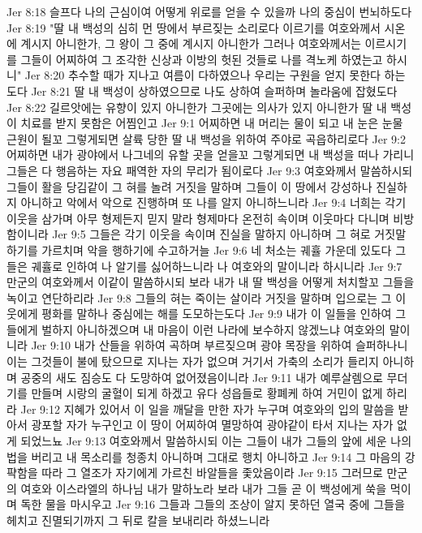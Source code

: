 Jer 8:18  슬프다 나의 근심이여 어떻게 위로를 얻을 수 있을까 나의 중심이 번뇌하도다
Jer 8:19  "딸 내 백성의 심히 먼 땅에서 부르짖는 소리로다 이르기를 여호와께서 시온에 계시지 아니한가, 그 왕이 그 중에 계시지 아니한가 그러나 여호와께서는 이르시기를 그들이 어찌하여 그 조각한 신상과 이방의 헛된 것들로 나를 격노케 하였는고 하시니"
Jer 8:20  추수할 때가 지나고 여름이 다하였으나 우리는 구원을 얻지 못한다 하는도다
Jer 8:21  딸 내 백성이 상하였으므로 나도 상하여 슬퍼하며 놀라움에 잡혔도다
Jer 8:22  길르앗에는 유향이 있지 아니한가 그곳에는 의사가 있지 아니한가 딸 내 백성이 치료를 받지 못함은 어찜인고
Jer 9:1  어찌하면 내 머리는 물이 되고 내 눈은 눈물 근원이 될꼬 그렇게되면 살륙 당한 딸 내 백성을 위하여 주야로 곡읍하리로다
Jer 9:2  어찌하면 내가 광야에서 나그네의 유할 곳을 얻을꼬 그렇게되면 내 백성을 떠나 가리니 그들은 다 행음하는 자요 패역한 자의 무리가 됨이로다
Jer 9:3  여호와께서 말씀하시되 그들이 활을 당김같이 그 혀를 놀려 거짓을 말하며 그들이 이 땅에서 강성하나 진실하지 아니하고 악에서 악으로 진행하며 또 나를 알지 아니하느니라
Jer 9:4  너희는 각기 이웃을 삼가며 아무 형제든지 믿지 말라 형제마다 온전히 속이며 이웃마다 다니며 비방함이니라
Jer 9:5  그들은 각기 이웃을 속이며 진실을 말하지 아니하며 그 혀로 거짓말 하기를 가르치며 악을 행하기에 수고하거늘
Jer 9:6  네 처소는 궤휼 가운데 있도다 그들은 궤휼로 인하여 나 알기를 싫어하느니라 나 여호와의 말이니라 하시니라
Jer 9:7  만군의 여호와께서 이같이 말씀하시되 보라 내가 내 딸 백성을 어떻게 처치할꼬 그들을 녹이고 연단하리라
Jer 9:8  그들의 혀는 죽이는 살이라 거짓을 말하며 입으로는 그 이웃에게 평화를 말하나 중심에는 해를 도모하는도다
Jer 9:9  내가 이 일들을 인하여 그들에게 벌하지 아니하겠으며 내 마음이 이런 나라에 보수하지 않겠느냐 여호와의 말이니라
Jer 9:10  내가 산들을 위하여 곡하며 부르짖으며 광야 목장을 위하여 슬퍼하나니 이는 그것들이 불에 탔으므로 지나는 자가 없으며 거기서 가축의 소리가 들리지 아니하며 공중의 새도 짐승도 다 도망하여 없어졌음이니라
Jer 9:11  내가 예루살렘으로 무더기를 만들며 시랑의 굴혈이 되게 하겠고 유다 성읍들로 황폐케 하여 거민이 없게 하리라
Jer 9:12  지혜가 있어서 이 일을 깨달을 만한 자가 누구며 여호와의 입의 말씀을 받아서 광포할 자가 누구인고 이 땅이 어찌하여 멸망하여 광야같이 타서 지나는 자가 없게 되었느뇨
Jer 9:13  여호와께서 말씀하시되 이는 그들이 내가 그들의 앞에 세운 나의 법을 버리고 내 목소리를 청종치 아니하며 그대로 행치 아니하고
Jer 9:14  그 마음의 강퍅함을 따라 그 열조가 자기에게 가르친 바알들을 좇았음이라
Jer 9:15  그러므로 만군의 여호와 이스라엘의 하나님 내가 말하노라 보라 내가 그들 곧 이 백성에게 쑥을 먹이며 독한 물을 마시우고
Jer 9:16  그들과 그들의 조상이 알지 못하던 열국 중에 그들을 헤치고 진멸되기까지 그 뒤로 칼을 보내리라 하셨느니라

